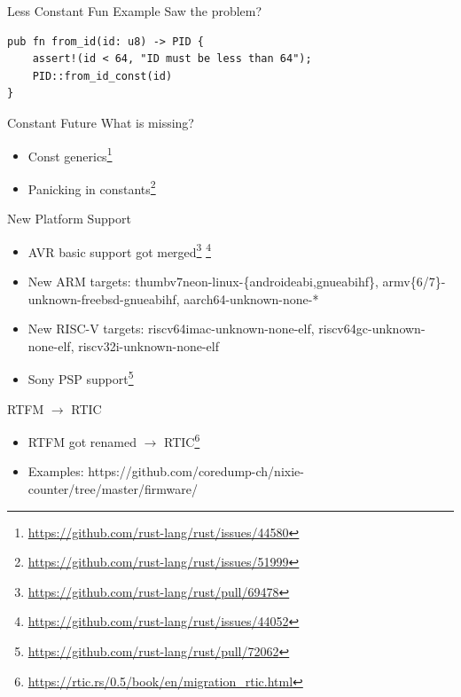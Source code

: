 \documentclass[aspectratio=1610,14pt,t]{beamer}
\begin{document}
\begin{frame}[c,fragile]{Less Constant Fun Example}
  Saw the problem?\pause
  \begin{verbatim}
pub fn from_id(id: u8) -> PID {
    assert!(id < 64, "ID must be less than 64");
    PID::from_id_const(id)
}
  \end{verbatim}
\end{frame}

\begin{frame}{Constant Future}
  What is missing?
  \begin{itemize}
    \item Const generics\footnote{\url{https://github.com/rust-lang/rust/issues/44580}}
    \item Panicking in constants\footnote{\url{https://github.com/rust-lang/rust/issues/51999}}
  \end{itemize}
\end{frame}


\begin{frame}[c]{New Platform Support}
  \begin{itemize}
    \item AVR basic support got merged\footnote{\url{https://github.com/rust-lang/rust/pull/69478}} \footnote{\url{https://github.com/rust-lang/rust/issues/44052}}
    \item New ARM targets: thumbv7neon-linux-\{androideabi,gnueabihf\}, armv\{6/7\}-unknown-freebsd-gnueabihf, aarch64-unknown-none-*
    \item New RISC-V targets: riscv64imac-unknown-none-elf, riscv64gc-unknown-none-elf, riscv32i-unknown-none-elf
    \item Sony PSP support\footnote{\url{https://github.com/rust-lang/rust/pull/72062}}
  \end{itemize}
\end{frame}

\begin{frame}[c]{RTFM $\rightarrow$ RTIC}
  \begin{itemize}
    \item RTFM got renamed $\rightarrow$ RTIC\footnote{\url{https://rtic.rs/0.5/book/en/migration_rtic.html}}
    \item Examples: https://github.com/coredump-ch/nixie-counter/tree/master/firmware/
  \end{itemize}
\end{frame}
\end{document}
